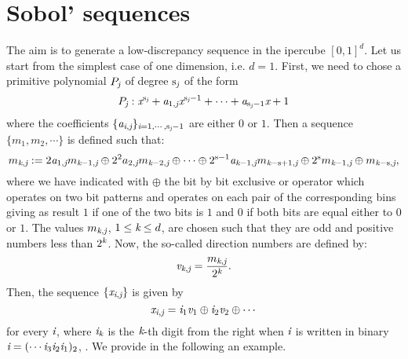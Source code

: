 \section{Sobol' sequences}
The aim is to generate a low-discrepancy sequence in the ipercube $[0,1]^{d}$. 
Let us start from the simplest case of one dimension, i.e. $d=1$. First, we need to chose a primitive polynomial $P_{\textit{j}}$ of degree $\textrm{s}_{\textit{j}}$ of the form
\begin{equation}
P_{\textit{j}}:\textit{x}^{\textrm{s}_{\textit{j}}}+\textit{a}_{1, \textit{j}}\textit{x}^{\textrm{s}_{\textit{j}}-1}+\cdots+\textit{a}_{\textrm{s}_{\textit{j}}-1}\textit{x}+1
\end{equation}
where the coefficients $\{\textit{a}_{\textit{i},\textit{j}}\}_{\textit{i}= 1, \cdots, \textrm{s}_{\textit{j}}-1}$ are either $0$ or $1$. 
Then a sequence $\{m_1,m_2,\cdots\}$ is defined such that:
\begin{equation}\label{eq:m}
m_{\textit{k}, \textit{j}} := 2\textit{a}_{1, \textit{j}}m_{\textit{k}-1, \textit{j}}\oplus 2^2a_{2, \textit{j}}m_{\textit{k}-2, \textit{j}}\oplus \cdots \oplus 2^{\textrm{s}-1}\textit{a}_{\textit{k}-1, \textit{j}}m_{\textit{k}-\textrm{s}+1, \textit{j}}\oplus 2^{\textrm{s}}m_{\textit{k}-1, \textit{j}}\oplus m_{\textit{k}-\textrm{s}, \textit{j}},
\end{equation}
where we have indicated with $\oplus$ the bit by bit exclusive or operator which operates on two bit patterns and operates on each pair of the corresponding bins giving as result $1$ if one of the two bits is $1$ and $0$ if both bits are equal either to $0$ or $1$. The values $m_{\textit{k}, \textit{j}}$, $1\leq\textit{k}\leq d$, are chosen such that they are odd and positive numbers less than $2^{\textit{k}}$. Now, the so-called direction numbers are defined by:
\begin{equation}\label{eq:dir_numb}
\textit{v}_{\textit{k}, \textit{j}}=\frac{m_{\textit{k}, \textit{j}}}{2^{\textit{k}}}.
\end{equation}
Then, the sequence $\{\textit{x}_{\textit{i}, \textit{j}}\}$ is given by
\begin{equation}\label{eq:x}
\textit{x}_{\textit{i}, \textit{j}} = \textit{i}_1\textit{v}_1\oplus \textit{i}_2\textit{v}_{2}\oplus \cdots
\end{equation}
for every $\textit{i}$, where $\textit{i}_{\textit{k}}$ is the $\textit{k}$-th digit from the right when $\textit{i}$ is written in binary $\textit{i} = (\cdots \textit{i}_3\textit{i}_2\textit{i}_1)_2$, \cite{joe2008notes}. We provide in the following an example. \\ \indent
